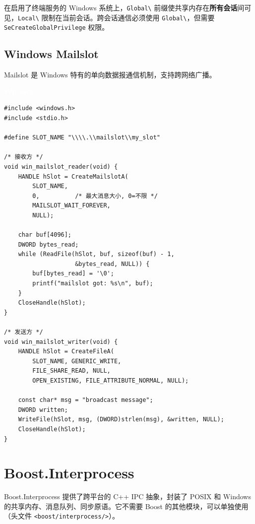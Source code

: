 \documentclass[12pt,a4paper,fontset=fandol]{ctexbook}
\newcommand{\Tp}[1]{\texttt{#1}}
\newcommand{\winlabel}{%
  \noindent\begin{tcolorbox}[sharp corners,colback=winheadbg,colframe=winheadbg,
    left=6pt,right=6pt,top=2pt,bottom=2pt,boxrule=0pt]
  \textcolor{white}{\small\bfseries\sffamily Winsock}\end{tcolorbox}%
}
\begin{document}
\begin{note}[title=命名前缀 Global\textbackslash{} vs Local\textbackslash{}]
在启用了终端服务的 Windows 系统上，\Tp{Global\textbackslash{}} 前缀使共享内存在\textbf{所有会话}间可见，\Tp{Local\textbackslash{}} 限制在当前会话。跨会话通信必须使用 \Tp{Global\textbackslash{}}，但需要 \Tp{SeCreateGlobalPrivilege} 权限。
\end{note}

\subsection{Windows Mailslot}

Mailslot 是 Windows 特有的单向数据报通信机制，支持跨网络广播。

\winlabel
\begin{lstlisting}[style=cstyle]
#include <windows.h>
#include <stdio.h>

#define SLOT_NAME "\\\\.\\mailslot\\my_slot"

/* 接收方 */
void win_mailslot_reader(void) {
    HANDLE hSlot = CreateMailslotA(
        SLOT_NAME,
        0,          /* 最大消息大小, 0=不限 */
        MAILSLOT_WAIT_FOREVER,
        NULL);

    char buf[4096];
    DWORD bytes_read;
    while (ReadFile(hSlot, buf, sizeof(buf) - 1,
                    &bytes_read, NULL)) {
        buf[bytes_read] = '\0';
        printf("mailslot got: %s\n", buf);
    }
    CloseHandle(hSlot);
}

/* 发送方 */
void win_mailslot_writer(void) {
    HANDLE hSlot = CreateFileA(
        SLOT_NAME, GENERIC_WRITE,
        FILE_SHARE_READ, NULL,
        OPEN_EXISTING, FILE_ATTRIBUTE_NORMAL, NULL);

    const char* msg = "broadcast message";
    DWORD written;
    WriteFile(hSlot, msg, (DWORD)strlen(msg), &written, NULL);
    CloseHandle(hSlot);
}
\end{lstlisting}

\section{Boost.Interprocess}

Boost.Interprocess 提供了跨平台的 C++ IPC 抽象，封装了 POSIX 和 Windows 的共享内存、消息队列、同步原语。它不需要 Boost 的其他模块，可以单独使用（头文件 \Tp{<boost/interprocess/>}）。
\end{document}
